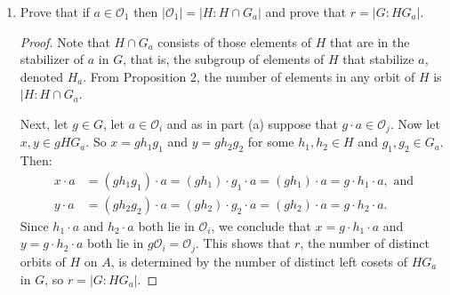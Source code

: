\documentclass{article}
\begin{document}
\begin{enumerate}[itemsep=0em, label=(\alph*)]
\begin{proof}
            Thus for each $g \in G$ and each $i \in \{ 1, ..., r \}$ there is a $j$ such that $g\mathcal{O}_i = \mathcal{O}_j$. This further implies that all orbits of a normal subgroup have the same cardinality, since $g\mathcal{O}_i = \mathcal{O}_j$ implies that $|\mathcal{O}_i| = |\mathcal{O}_j|$.
        \end{proof}
    \item Prove that if $a \in \mathcal{O}_1$ then $|\mathcal{O}_1| = |H:H \cap G_a|$ and prove that \newline $r = |G:HG_a|$.
        \begin{proof}
            Note that $H \cap G_a$ consists of those elements of $H$ that are in the stabilizer of $a$ in $G$, that is, the subgroup of elements of $H$ that stabilize $a$, denoted $H_a$. From Proposition 2, the number of elements in any orbit of $H$ is $|H:H \cap G_a$.

            Next, let $g \in G$, let $a \in \mathcal{O}_i$ and as in part (a) suppose that $g \cdot a \in \mathcal{O}_j$. Now let $x, y \in gHG_a$. So $x = gh_1g_1$ and $y = gh_2g_2$ for some $h_1, h_2 \in H$ and $g_1, g_2 \in G_a$. Then:
            \begin{align*}
                x \cdot a &= (gh_1g_1) \cdot a = (gh_1) \cdot g_1 \cdot a = (gh_1) \cdot a = g \cdot h_1 \cdot a, \text{ and} \\
                y \cdot a &= (gh_2g_2) \cdot a = (gh_2) \cdot g_2 \cdot a = (gh_2) \cdot a = g \cdot h_2 \cdot a.
            \end{align*}
            Since $h_1 \cdot a$ and $h_2 \cdot a$ both lie in $\mathcal{O}_i$, we conclude that $x = g \cdot h_1 \cdot a$ and $y = g \cdot h_2 \cdot a$ both lie in $g\mathcal{O}_i = \mathcal{O}_j$. This shows that $r$, the number of distinct orbits of $H$ on $A$, is determined by the number of distinct left cosets of $HG_a$ in $G$, so $r = |G:HG_a|$.
        \end{proof}
\end{enumerate}


            
\end{document}

